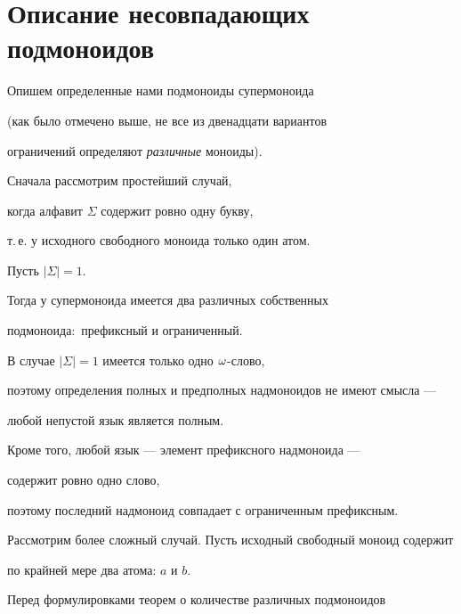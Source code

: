  \section{Описание несовпадающих подмоноидов}


 \label{opisa}





 Опишем определенные нами подмоноиды супермоноида


 (как было отмечено выше, не все из двенадцати вариантов 


ограничений определяют {\it различные\/} моноиды).


 Сначала рассмотрим простейший случай,


 когда алфавит $\Sigma$ содержит ровно одну букву,


 т.\,е. у исходного свободного моноида только один атом.





 \begin{props}


 Пусть $|\Sigma|=1$.


 Тогда у супермоноида имеется два различных собственных 


подмоноида\/${:}$ префиксный и ограниченный.


 \end{props}





\begin{pf}


 В случае $|\Sigma|=1$ имеется только одно $\omega$-слово,


 поэтому определения полных и предполных надмоноидов не имеют смысла ---


 любой непустой язык является полным.


 Кроме того, любой язык --- элемент префиксного надмоноида ---


 содержит ровно одно слово,


 поэтому последний надмоноид совпадает с ограниченным префиксным.


\end{pf}





 Рассмотрим более сложный случай. Пусть исходный свободный моноид содержит


 по крайней мере два атома: $a$ и $b$.


 Перед формулировками теорем о количестве различных подмоноидов


